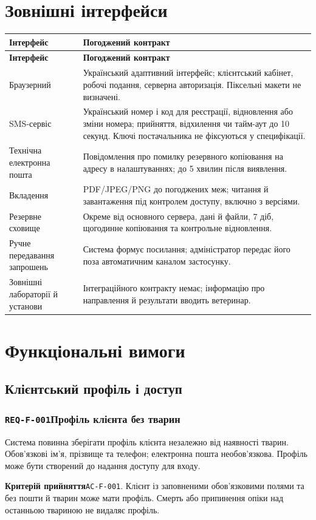 \documentclass[11pt,a4paper]{article}
\newcommand{\requirement}[4]{%
  \Needspace{7\baselineskip}%
  \subsubsection*{\hypertarget{#1}{\texttt{#1}}\quad #2}%
  #3\par
  \textbf{Критерій прийняття}\quad #4\par\medskip}
\begin{document}
\section{Зовнішні інтерфейси}
\begin{longtable}{>{\raggedright\arraybackslash}p{4.2cm} >{\raggedright\arraybackslash}p{11.4cm}}
\toprule
\textbf{Інтерфейс} & \textbf{Погоджений контракт} \\ \midrule
\endfirsthead
\toprule
\textbf{Інтерфейс} & \textbf{Погоджений контракт} \\ \midrule
\endhead
\bottomrule
\endfoot
Браузерний & Український адаптивний інтерфейс; клієнтський кабінет, робочі подання, серверна авторизація. Піксельні макети не визначені. \\
SMS-сервіс & Український номер і код для реєстрації, відновлення або зміни номера; прийняття, відхилення чи тайм-аут до 10 секунд. Ключі постачальника не фіксуються у специфікації. \\
Технічна електронна пошта & Повідомлення про помилку резервного копіювання на адресу в налаштуваннях; до 5 хвилин після виявлення. \\
Вкладення & PDF/JPEG/PNG до погоджених меж; читання й завантаження під контролем доступу, включно з версіями. \\
Резервне сховище & Окреме від основного сервера, дані й файли, 7 діб, щогодинне копіювання та контрольне відновлення. \\
Ручне передавання запрошень & Система формує посилання; адміністратор передає його поза автоматичним каналом застосунку. \\
Зовнішні лабораторії й установи & Інтеграційного контракту немає; інформацію про направлення й результати вводить ветеринар. \\
\end{longtable}

\section{Функціональні вимоги}
\subsection{Клієнтський профіль і доступ}
\requirement{REQ-F-001}{Профіль клієнта без тварин}{Система повинна зберігати профіль клієнта незалежно від наявності тварин. Обов’язкові ім’я, прізвище та телефон; електронна пошта необов’язкова. Профіль може бути створений до надання доступу для входу.}{\hypertarget{AC-F-001}{\texttt{AC-F-001}}. Клієнт із заповненими обов’язковими полями та без пошти й тварин може мати профіль. Смерть або припинення опіки над останньою твариною не видаляє профіль.}
\end{document}
